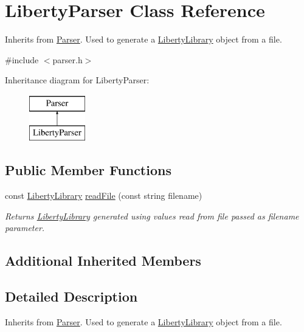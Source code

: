 \hypertarget{classLibertyParser}{\section{Liberty\-Parser Class Reference}
\label{classLibertyParser}
}


Inherits from \hyperlink{classParser}{Parser}. Used to generate a \hyperlink{classLibertyLibrary}{Liberty\-Library} object from a file.  




{\ttfamily \#include $<$parser.\-h$>$}

Inheritance diagram for Liberty\-Parser\-:\begin{figure}[H]
\begin{center}
\leavevmode
\includegraphics[height=2.000000cm]{classLibertyParser}
\end{center}
\end{figure}
\subsection*{Public Member Functions}
\begin{DoxyCompactItemize}
\item 
const \hyperlink{classLibertyLibrary}{Liberty\-Library} \hyperlink{classLibertyParser_a474451e29a86949f6ebef6948363874d}{read\-File} (const string filename)
\begin{DoxyCompactList}\small\item\em Returns \hyperlink{classLibertyLibrary}{Liberty\-Library} generated using values read from file passed as filename parameter. \end{DoxyCompactList}\end{DoxyCompactItemize}
\subsection*{Additional Inherited Members}


\subsection{Detailed Description}
Inherits from \hyperlink{classParser}{Parser}. Used to generate a \hyperlink{classLibertyLibrary}{Liberty\-Library} object from a file. 

